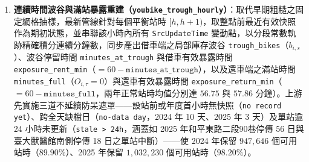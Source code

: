 \begin{enumerate}
\begin{enumerate}[label = \textbullet]
        \item \textbf{連續時間波谷與滿站暴露重建（\texttt{youbike\_trough\_hourly}）}：取代早期粗糙之固定網格抽樣，最新管線針對每個平衡站時 $[h, h+1)$，取整點前最近有效快照作為期初狀態，並串聯該小時內所有 \texttt{SrcUpdateTime} 變動點，以分段常數軌跡精確積分連續分鐘數，同步產出借車端之局部庫存波谷 \texttt{trough\_bikes}（$b_{i,s}$）、波谷停留時間 \texttt{minutes\_at\_trough} 與借車有效暴露時間 \texttt{exposure\_rent\_min}（$= 60 - \texttt{minutes\_at\_trough}$），以及還車端之滿站時間 \texttt{minutes\_full}（$O_{i,\tau} = 0$）與還車有效暴露時間 \texttt{exposure\_return\_min}（$= 60 - \texttt{minutes\_full}$，兩年正常站時均值分別達 $56.75$ 與 $57.86$ 分鐘）。上游先實施三道不延續防呆遮罩——設站前或年度首小時無快照（\texttt{no record yet}）、跨全天缺檔日（\texttt{no-data day}，2024 年 10 天、2025 年 3 天）及單站逾 24 小時未更新（\texttt{stale > 24h}，涵蓋如 2025 年和平東路二段90巷停傳 56 日與臺大獸醫館南側停傳 18 日之單站中斷）——使 2024 年保留 $947{,}646$ 個可用站時（$89.90\%$）、2025 年保留 $1{,}032{,}230$ 個可用站時（$98.20\%$）。
    \end{enumerate}


\end{enumerate}
